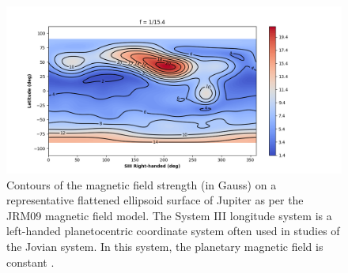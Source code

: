 \begin{figure}
    \centering
    \includegraphics[width=\textwidth]{images6/JRM09_Bmag.png}
    \caption{Contours of the magnetic field strength (in Gauss) on a representative flattened ellipsoid surface of Jupiter as per the JRM09 magnetic field model. The System III longitude system is a left-handed planetocentric coordinate system often used in studies of the Jovian system. In this system, the planetary magnetic field is constant
    \protect\cite{Connerney2018}.}
    \label{fig:JRM09}
\end{figure}


